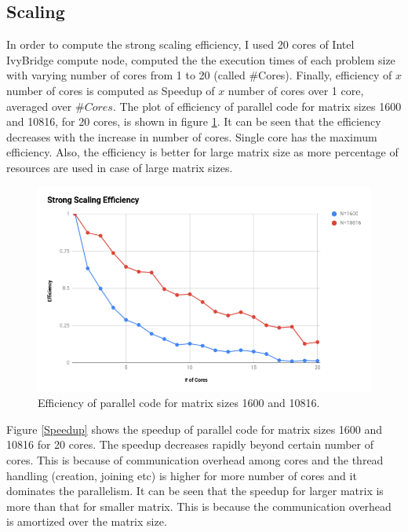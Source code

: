 \documentclass{article}
\begin{document}
\begin{spacing}{1.1}
\subsection{Scaling}
In order to compute the strong scaling efficiency, I used 20 cores of Intel IvyBridge compute node, computed the the execution times of each problem size with varying number of cores from 1 to 20 (called \#Cores). Finally, efficiency of $x$ number of cores is computed as Speedup of $x$ number of cores over 1 core, averaged over $\#Cores$.
The plot of efficiency of parallel code for matrix sizes 1600 and 10816, for 20 cores, is shown in figure \ref{eff}. It can be seen that the efficiency decreases with the increase in number of cores. Single core has the maximum efficiency. Also, the efficiency is better for large matrix size as more percentage of resources are used in case of large matrix sizes. 


\begin{center}
	\begin{figure}[H]
	\centering
       \includegraphics[scale=.40]{strongscaling.png}
        \caption{\label{eff} Efficiency of parallel code for matrix sizes 1600 and 10816.} 
	\end{figure}
\end{center}

Figure \ref{Speedup} shows the speedup of parallel code for matrix sizes 1600 and 10816 for 20 cores. The speedup decreases rapidly beyond certain number of cores. This is because of communication overhead among cores and the thread handling (creation, joining etc) is higher for more number of cores and it dominates the parallelism. It can be seen that the speedup for larger matrix is more than that for smaller matrix. This is because the communication overhead is amortized over the matrix size. 


\end{spacing}
\end{document}
